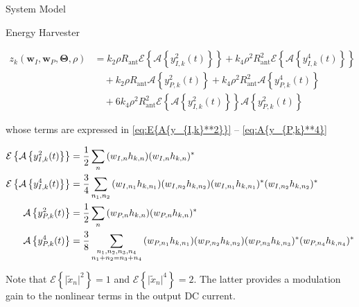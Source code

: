 \documentclass{IEEEtran}
\begin{document}
\begin{section} {System Model}
\begin{subsection}	{Energy Harvester}
		\begin{strip}
			\begin{equation}	\label{eq:z_k_truncated}
				\begin{split}
					z_k(\boldsymbol{w}_I,\boldsymbol{w}_P,\boldsymbol{\Theta},\rho)
					&={k_2}{\rho}{R_{\text{ant}}}\mathcal{E}\left\{\mathcal{A}\left\{y_{I,k}^2(t)\right\}\right\}+{k_4}{\rho^2}{R_{\text{ant}}^2}\mathcal{E}\left\{\mathcal{A}\left\{y_{I,k}^4(t)\right\}\right\}	\\
					&\quad+{k_2}{\rho}{R_{\text{ant}}}\mathcal{A}\left\{y_{P,k}^2(t)\right\}+{k_4}{\rho^2}{R_{\text{ant}}^2}\mathcal{A}\left\{y_{P,k}^4(t)\right\}	\\
					&\quad+6{k_4}{\rho^2}{R_{\text{ant}}^2}\mathcal{E}\left\{\mathcal{A}\left\{y_{I,k}^2(t)\right\}\right\}\mathcal{A}\left\{y_{P,k}^2(t)\right\}
				\end{split}
			\end{equation}
		\end{strip}
		whose terms are expressed in \ref{eq:E{A{y_{I,k}**2}}} -- \ref{eq:A{y_{P,k}**4}}	\\
		\begin{strip}
			\begin{align}
				\mathcal{E}\left\{\mathcal{A}\left\{y_{I,k}^2(t)\right\}\right\} & =\frac{1}{2}\sum_n{(w_{I,n}h_{k,n})(w_{I,n}h_{k,n})^*}	\label{eq:E{A{y_{I,k}**2}}}                                                                                                                                                  \\
				\mathcal{E}\left\{\mathcal{A}\left\{y_{I,k}^4(t)\right\}\right\} & =\frac{3}{4}\sum_{{n_1},{n_2}}{(w_{I,{n_1}}h_{k,{n_1}})(w_{I,{n_2}}h_{k,{n_2}})(w_{I,{n_1}}h_{k,{n_1}})^*(w_{I,{n_2}}h_{k,{n_2}})^*}	\label{eq:E{A{y_{I,k}**4}}}                                                                    \\
				\mathcal{A}\left\{y_{P,k}^2(t)\right\}                           & =\frac{1}{2}\sum_n{(w_{P,n}h_{k,n})(w_{P,n}h_{k,n})^*}	\label{eq:A{y_{P,k}**2}}                                                                                                                                                     \\
				\mathcal{A}\left\{y_{P,k}^4(t)\right\}                           & =\frac{3}{8}\sum_{\substack{{n_1},{n_2},{n_3},{n_4}\\{n_1}+{n_2}={n_3}+{n_4}}}{(w_{P,{n_1}}h_{k,{n_1}})(w_{P,{n_2}}h_{k,{n_2}})(w_{P,{n_3}}h_{k,{n_3}})^*(w_{P,{n_4}}h_{k,{n_4}})^*}	\label{eq:A{y_{P,k}**4}}
			\end{align}
		\end{strip}
		Note that $\mathcal{E}\left\{\lvert\tilde{x}_n\rvert^2\right\}=1$ and $\mathcal{E}\left\{\lvert\tilde{x}_n\rvert^4\right\}=2$. The latter provides a modulation gain to the nonlinear terms in the output DC current.


	\end{subsection}
\end{section}



\end{document}
